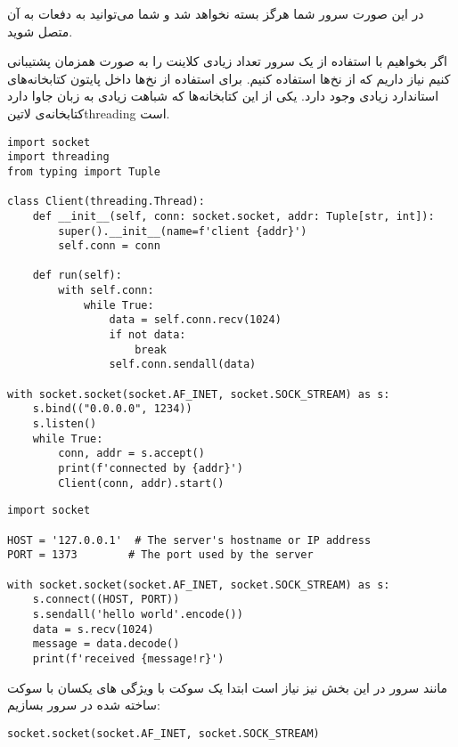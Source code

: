 \documentclass[]{article}
\begin{document}
  در این صورت سرور شما هرگز بسته نخواهد شد و شما می‌توانید به دفعات به آن متصل شوید.


  اگر بخواهیم با استفاده از یک سرور تعداد زیادی کلاینت را به صورت همزمان پشتیبانی کنیم نیاز داریم که از نخ‌ها استفاده کنیم.
  برای استفاده از نخ‌ها داخل پایتون کتابخانه‌های استاندارد زیادی وجود دارد. یکی از این کتابخانه‌ها که شباهت زیادی به زبان جاوا دارد
  کتابخانه‌ی ‌لاتین{threading} است.

  \begin{latin}
  \begin{verbatim}
import socket
import threading
from typing import Tuple

class Client(threading.Thread):
    def __init__(self, conn: socket.socket, addr: Tuple[str, int]):
        super().__init__(name=f'client {addr}')
        self.conn = conn

    def run(self):
        with self.conn:
            while True:
                data = self.conn.recv(1024)
                if not data:
                    break
                self.conn.sendall(data)

with socket.socket(socket.AF_INET, socket.SOCK_STREAM) as s:
    s.bind(("0.0.0.0", 1234))
    s.listen()
    while True:
        conn, addr = s.accept()
        print(f'connected by {addr}')
        Client(conn, addr).start()
  \end{verbatim}
  \end{latin}



  \begin{latin}
  \begin{verbatim}
import socket

HOST = '127.0.0.1'  # The server's hostname or IP address
PORT = 1373        # The port used by the server

with socket.socket(socket.AF_INET, socket.SOCK_STREAM) as s:
    s.connect((HOST, PORT))
    s.sendall('hello world'.encode())
    data = s.recv(1024)
    message = data.decode()
    print(f'received {message!r}')
  \end{verbatim}
  \end{latin}

مانند سرور در این بخش نیز نیاز است ابتدا یک سوکت با ویژگی های یکسان با سوکت ساخته شده در سرور بسازیم:

  \begin{latin}
  \begin{verbatim}
socket.socket(socket.AF_INET, socket.SOCK_STREAM)
  \end{verbatim}
  \end{latin}
\end{document}
